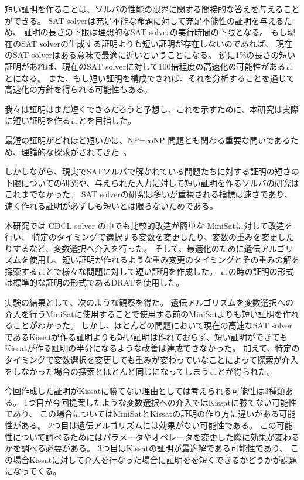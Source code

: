 短い証明を作ることは、ソルバの性能の限界に関する間接的な答えを与えることができる。
SAT solverは充足不能な命題に対して充足不能性の証明を与えるため、
証明の長さの下限は理想的なSAT solverの実行時間の下限となる。 
もし現在のSAT solverの生成する証明よりも短い証明が存在しないのであれば、
現在のSAT solverはある意味で最適に近いということになる。
逆に1\%の長さの短い証明があれば、現在のSAT solverに対して100倍程度の高速化の可能性があることになる。
また、もし短い証明を構成できれば、それを分析することを通じて高速化の方針を得られる可能性もある。

我々は証明はまだ短くできるだろうと予想し、これを示すために、本研究は実際に短い証明を作ることを目指した。

最短の証明がどれほど短いかは、NP=coNP 問題とも関わる重要な問いであるため、理論的な探求がされてきた~\cite{}。

しかしながら、現実でSATソルバで解かれている問題たちに対する証明の短さの下限についての研究や、与えられた入力に対して短い証明を作るソルバの研究はこれまでなかった。
SAT solverの研究は多いが重視される指標は速さであり、速く作れる証明が必ずしも短いとは限らないためである。


本研究では CDCL solver の中でも比較的改造が簡単な MiniSatに対して改造を行い、
特定のタイミングで選択する変数を変更したり、変数の重みを変更したりするなど、変数選択へ介入を行った。
そして、最適化のために遺伝アルゴリズムを使用し、短い証明が作れるような重み変更のタイミングとその重みの解を探索することで様々な問題に対して短い証明を作成した。
この時の証明の形式は標準的な証明の形式であるDRATを使用した。

実験の結果として、次のような観察を得た。
遺伝アルゴリズムを変数選択への介入を行うMiniSatに使用することで使用する前のMiniSatよりも短い証明を作れることがわかった。
しかし、ほとんどの問題において現在の高速なSAT solverであるKissatが作る証明よりも短い証明は作れておらず、短い証明ができてもKissatが作る証明の半分になるような改善は達成できなかった。
加えて、特定のタイミングで変数選択を変更しても重みが変わっていなことによって探索が介入をしなかった場合の探索とほとんど同じになってしまうことが得られた。

今回作成した証明がKissatに勝てない理由としては考えられる可能性は3種類ある。
1つ目が今回提案したような変数選択への介入ではKissatに勝てない可能性であり、
この場合についてはMiniSatとKissatの証明の作り方に違いがある可能性がある。
2つ目は遺伝アルゴリズムには効果がない可能性である。
この可能性について調べるためにはパラメータやオペレータを変更した際に効果が変わるかを調べる必要がある。
3つ目はKissatの証明が最適解である可能性であり、
この場合Kissatに対して介入を行なった場合に証明をを短くできるかどうかが課題になってくる。
